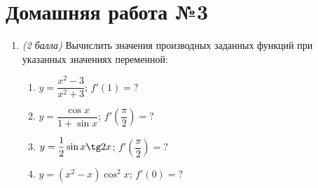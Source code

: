 \documentclass[12pt, a4paper]{article}
\begin{document}
		

\section*{Домашняя работа №3}
\begin{enumerate}
	\item \textit{(2 балла)} Вычислить значения производных заданных функций при указанных значениях переменной:
	\begin{multicols}{2}
		\begin{enumerate}[label=\asbuk*)]
			\item $y=\dfrac{x^2-3}{x^2+3}$; $f'(1)=?$
			\item $y=\dfrac{\cos x}{1+\sin x}$; $f'\left(\dfrac{\pi}{2}\right)=?$
			\item $y=\dfrac{1}{2}\sin x\tg2x$; $f'\left(\dfrac{\pi}{2}\right)=?$
			\item $y=(x^2-x)\cos^2x$; $f'(0)=?$
		\end{enumerate}
	\end{multicols}
	 

\end{enumerate}
\end{document}
